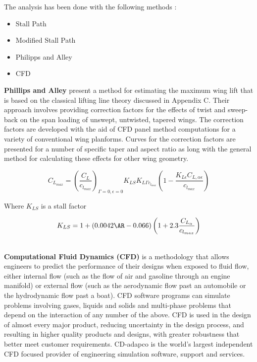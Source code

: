 The analysis has been done with the following methods :

\begin{itemize}
\item Stall Path
\item Modified Stall Path
\item Philipps and Alley
\item CFD
\end{itemize}

{\bfseries Phillips and Alley} present a method for estimating the maximum wing lift that is based on the classical lifting line theory discussed in Appendix C. Their approach involves providing correction factors for the effects of twist and sweep-back on the span loading of unswept, untwisted, tapered wings. The correction factors are developed with the aid of CFD panel method computations for a variety of conventional wing planforms. Curves for the correction factors are presented for a number of specific taper and aspect ratio as long with the general method for calculating these effects for other wing geometry. \cite{sforza2014commercial}

\begin{equation}
C_{L_{max}} = \left ( \frac{C_L}{c_{l_{max}}}\right)_{\Gamma =0 , \epsilon =0} K_{LS} K_{L\Gamma c_{l_{max}}} \left ( 1 - \frac { K_{L \epsilon} C_{L,\alpha \epsilon}}{c_{l_{max}}} \right) 
\end{equation}

Where $K_{LS}$ is a stall factor

\begin{equation}
K_{LS}=1 + (0.0042 \AR -0.066) \left (1+2.3 \frac{C_{L_{\alpha}}}{ c_{l_{max}}} \right )
\end{equation}

\noindent \\
{\bfseries Computational Fluid Dynamics (CFD)} is a methodology that allows engineers to predict the performance of their designs when exposed to fluid flow, either internal flow (such as the flow of air and gasoline through an engine manifold) or external flow (such as the aerodynamic flow past an automobile or the hydrodynamic flow past a boat). CFD software programs can simulate problems involving gases, liquids and solids and multi-phase problems that depend on the interaction of any number of the above. CFD is used in the design of almost every major product, reducing uncertainty in the design process, and resulting in higher quality products and designs, with greater robustness that better meet customer requirements. CD-adapco is the world's largest independent CFD focused provider of engineering simulation software, support and services. \cite{adapco}



